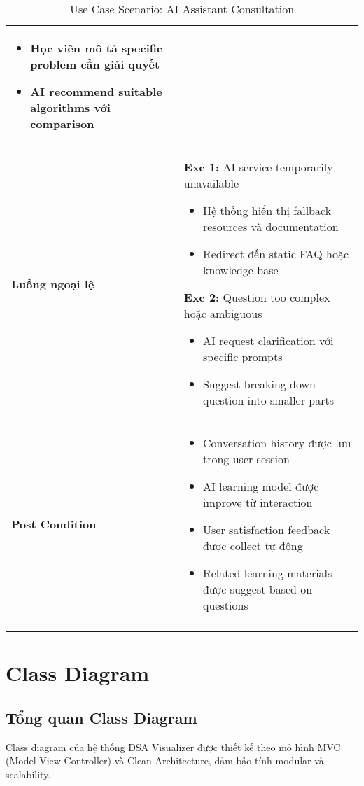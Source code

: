 \begin{longtable}{| p{3cm} | p{10cm} |}
\begin{itemize}
    \item Học viên mô tả specific problem cần giải quyết
    \item AI recommend suitable algorithms với comparison
\end{itemize} \\ \hline
\textbf{Luồng ngoại lệ} & 
\textbf{Exc 1:} AI service temporarily unavailable
\begin{itemize}
    \item Hệ thống hiển thị fallback resources và documentation
    \item Redirect đến static FAQ hoặc knowledge base
\end{itemize}
\textbf{Exc 2:} Question too complex hoặc ambiguous
\begin{itemize}
    \item AI request clarification với specific prompts
    \item Suggest breaking down question into smaller parts
\end{itemize} \\ \hline
\textbf{Post Condition} & 
\begin{itemize}
    \item Conversation history được lưu trong user session
    \item AI learning model được improve từ interaction
    \item User satisfaction feedback được collect tự động
    \item Related learning materials được suggest based on questions
\end{itemize} \\ \hline
\caption{Use Case Scenario: AI Assistant Consultation}
\label{tab:uc003} \\
\end{longtable}

\section{Class Diagram}
\label{sec:class-diagram}

\subsection{Tổng quan Class Diagram}
\label{subsec:class-overview}

Class diagram của hệ thống DSA Visualizer được thiết kế theo mô hình MVC (Model-View-Controller) và Clean Architecture, đảm bảo tính modular và scalability.

